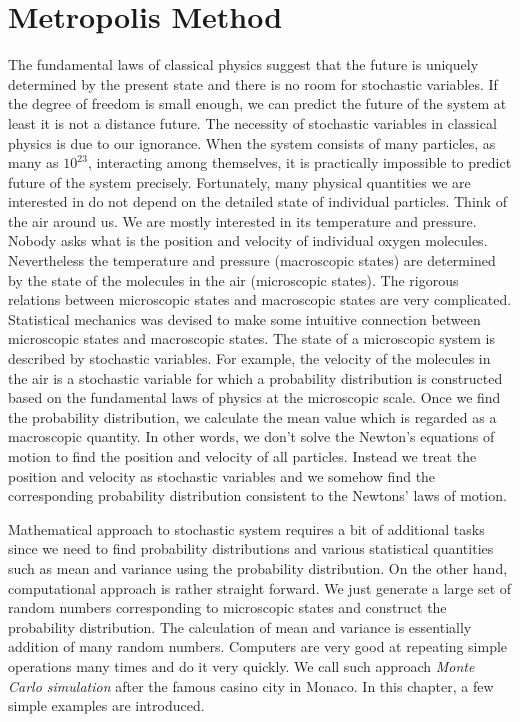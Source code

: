 \chapter{Metropolis Method}\label{ch:metropolis}

The fundamental laws of classical physics suggest that the future is uniquely determined by the present state and there is no room for stochastic variables. If the degree of freedom is small enough, we can predict the future of the system at least it is not a distance future. The necessity of stochastic variables in classical physics is due to our ignorance.  When the system consists of many particles, as many as $10^{23}$, interacting among themselves, it is practically impossible to predict future of the system precisely.  Fortunately, many physical quantities we are interested in do not depend on the detailed state of individual particles.  Think of the air around us.  We are mostly interested in its temperature and pressure.  Nobody asks what is the position and velocity of individual oxygen molecules.
Nevertheless the temperature and pressure (macroscopic states) are determined by the state of the molecules in the air (microscopic states). The rigorous relations between microscopic states and macroscopic states are very complicated.  Statistical mechanics was devised to make some intuitive connection between microscopic states and macroscopic states.\cite{sm1,sm2}  The state of a microscopic system is described by stochastic variables. For example, the velocity of the molecules in the air is a stochastic variable for which a probability distribution is constructed based on the fundamental laws of  physics at the microscopic scale. Once we find the probability distribution, we calculate the mean value which is regarded as a macroscopic quantity.  In other words, we don't solve the Newton's  equations of motion to find the position and velocity of all particles.  Instead we treat the position and velocity as stochastic variables and we somehow find the corresponding probability distribution consistent to the Newtons' laws of motion.

Mathematical approach to stochastic system requires a bit of additional tasks since we need to find probability distributions and various statistical quantities such as mean and variance using the probability distribution. On the other hand, computational approach is rather straight forward.  We just generate a large set of random numbers corresponding to microscopic states and construct the probability distribution.  The calculation of mean and variance is essentially addition of many random numbers.  Computers are very good at repeating simple operations many times and do it very quickly.  We call such approach \textit{Monte Carlo simulation}\cite{monte_carlo_methods}  after the famous casino city in Monaco.\cite{monte_carlo_methods}  In this chapter, a few simple examples are introduced.

